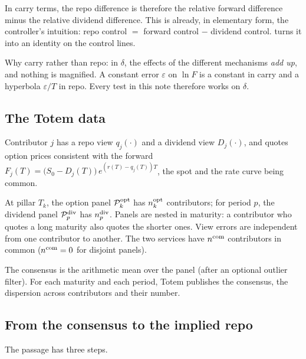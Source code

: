 In carry terms, the repo difference is therefore the relative forward difference minus the relative dividend
difference. This is already, in elementary form, the controller's intuition: repo control $=$ forward control $-$
dividend control.  turns it into an identity on the control lines.

\begin{retenir}
Why carry rather than repo: in $\delta$, the effects of the different mechanisms \emph{add up}, and nothing is
magnified. A constant error $\varepsilon$ on $\ln F$ is a constant in carry and a hyperbola $\varepsilon/T$ in repo.
Every test in this note therefore works on $\delta$.
\end{retenir}

\subsection{The Totem data}
\begin{assumption}\label{hyp-coherent}
Contributor $j$ has a repo view $q_j(\cdot)$ and a dividend view $D_j(\cdot)$, and quotes option prices consistent with
the forward $F_j(T)=\bigl(S_0-D_j(T)\bigr)\,e^{(r(T)-q_j(T))T}$, the spot and the rate curve being common.
\end{assumption}

\begin{assumption}[Panels]\label{hyp-panels}
At pillar $T_k$, the option panel $\mathcal{P}^{\mathrm{opt}}_k$ has $n^{\mathrm{opt}}_k$ contributors; for period $p$, the dividend panel $\mathcal{P}^{\mathrm{div}}_p$
has $n^{\mathrm{div}}_p$. Panels are nested in maturity: a contributor who quotes a long maturity also quotes the shorter ones.
View errors are independent from one contributor to another. The two services have $n^{\mathrm{com}}$ contributors in common
($n^{\mathrm{com}}=0$ for disjoint panels).
\end{assumption}

\begin{assumption}[Consensus]\label{hyp-consensus}
The consensus is the arithmetic mean over the panel (after an optional outlier filter). For each maturity and each
period, Totem publishes the consensus, the dispersion across contributors and their number.
\end{assumption}

\subsection{From the consensus to the implied repo}\label{sec-bootstrap}
The passage has three steps.

